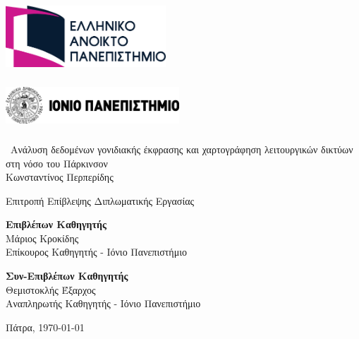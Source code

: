 \documentclass[12pt]{report}
\begin{document}
\clearpage
\thispagestyle{empty} %
\begin{center}
    
    \begin{minipage}[t]{0.45\textwidth}
        \centering
        \includegraphics[height=2.4cm,width=6cm]{university1-logo.png}\\
    \end{minipage}
    \hfill
    \begin{minipage}[t]{0.45\textwidth}
        \centering
        \includegraphics[height=1.8cm,width=6.5cm]{university2-logo.png}\\
    \end{minipage}
    \vspace*{2cm}
    
    \fontsize{18pt}{22pt}\selectfont\
        Ανάλυση δεδομένων γονιδιακής έκφρασης και χαρτογράφηση λειτουργικών δικτύων στη νόσο του Πάρκινσον\\
    \vspace*{2.5cm}
    \large Κωνσταντίνος Περπερίδης\\
    \vspace*{2.5cm}
    \begin{center}
    \fontsize{12pt}{14pt}\selectfont
    Επιτροπή Επίβλεψης Διπλωματικής Εργασίας\\[16pt]
    \begin{minipage}[t]{0.45\textwidth}
        \centering
        \fontsize{12pt}{14pt}\selectfont
        \textbf{Επιβλέπων Καθηγητής}\\
        Μάριος Κροκίδης\\
        Επίκουρος Καθηγητής - Ιόνιο Πανεπιστήμιο
    \end{minipage}
    \hfill %
    \begin{minipage}[t]{0.45\textwidth}
        \centering
        \fontsize{12pt}{14pt}\selectfont
        \textbf{Συν-Επιβλέπων Καθηγητής}\\
        Θεμιστοκλής Έξαρχος\\
        Αναπληρωτής Καθηγητής - Ιόνιο Πανεπιστήμιο
    \end{minipage}
    \end{center}
    \vspace*{2.5cm}
    \fontsize{14pt}{16pt}\selectfont
    Πάτρα, {\large \today}
    
    \vfill
\end{center}
\clearpage
\end{document}
